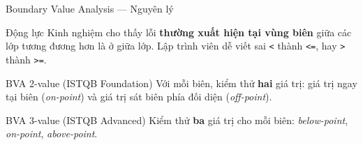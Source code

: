 \documentclass[aspectratio=169,12pt]{beamer}
\begin{document}
\begin{frame}{Boundary Value Analysis --- Nguyên lý}
  \begin{block}{Động lực}
    Kinh nghiệm cho thấy lỗi \textbf{thường xuất hiện tại vùng biên}
    giữa các lớp tương đương hơn là ở giữa lớp.
    Lập trình viên dễ viết sai \texttt{<} thành \texttt{<=},
    hay \texttt{>} thành \texttt{>=}.
  \end{block}

  \vspace{0.5em}
  \begin{block}{BVA 2-value (ISTQB Foundation)}
    Với mỗi biên, kiểm thử \textbf{hai} giá trị:
    giá trị ngay tại biên (\textit{on-point}) và
    giá trị sát biên phía đối diện (\textit{off-point}).
  \end{block}

  \begin{block}{BVA 3-value (ISTQB Advanced)}
    Kiểm thử \textbf{ba} giá trị cho mỗi biên:
    \textit{below-point}, \textit{on-point}, \textit{above-point}.
  \end{block}
\end{frame}
\end{document}
